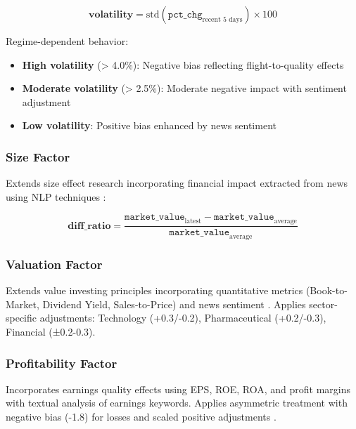 \documentclass[3p,times,procedia]{elsarticle}
\begin{document}
\begin{equation}
\textbf{volatility} = \text{std}(\texttt{pct\_chg}_{\text{recent 5 days}}) \times 100
\end{equation}

Regime-dependent behavior:
\begin{itemize}
    \item \textbf{High volatility} (> 4.0\%): Negative bias reflecting flight-to-quality effects
    \item \textbf{Moderate volatility} (> 2.5\%): Moderate negative impact with sentiment adjustment  
    \item \textbf{Low volatility}: Positive bias enhanced by news sentiment
\end{itemize}

\subsubsection{{Size Factor}}

Extends size effect research \cite{Banz1981} incorporating financial impact extracted from news using NLP techniques \cite{Loughran2011}:

\begin{equation}
\textbf{diff\_ratio} = \frac{\texttt{market\_value}_{\text{latest}} - \texttt{market\_value}_{\text{average}}}{\texttt{market\_value}_{\text{average}}}
\end{equation}

\subsubsection{{Valuation Factor}}

Extends value investing principles \cite{Rosenberg1985,FAMA1993} incorporating quantitative metrics (Book-to-Market, Dividend Yield, Sales-to-Price) and news sentiment \cite{Loughran2011}. Applies sector-specific adjustments: Technology (+0.3/-0.2), Pharmaceutical (+0.2/-0.3), Financial (±0.2-0.3).

\subsubsection{{Profitability Factor}}

Incorporates earnings quality effects \cite{Zhang2006} using EPS, ROE, ROA, and profit margins with textual analysis of earnings keywords. Applies asymmetric treatment with negative bias (-1.8) for losses and scaled positive adjustments \cite{Kothari2009}.
\end{document}
